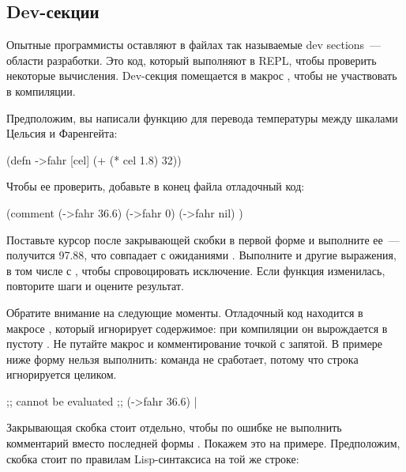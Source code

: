 \subsection{Dev-секции}

Опытные программисты оставляют в файлах так называемые dev sections~--- области разработки. Это код, который выполняют в REPL, чтобы проверить некоторые вычисления. Dev-секция помещается в макрос , чтобы не участвовать в компиляции.

Предположим, вы написали функцию  для перевода температуры между шкалами Цельсия и Фаренгейта:

\begin{english}
  \begin{clojure}
(defn ->fahr [cel]
  (+ (* cel 1.8) 32))
  \end{clojure}
\end{english}

Чтобы ее проверить, добавьте в конец файла отладочный код:

\begin{english}
  \begin{clojure/lines}
(comment
  (->fahr 36.6)
  (->fahr 0)
  (->fahr nil)
  )
  \end{clojure/lines}
\end{english}

Поставьте курсор после закрывающей скобки в первой форме и выполните ее~--- получится 97.88, что совпадает с ожиданиями . Выполните и другие выражения, в том числе с , чтобы спровоцировать исключение. Если функция изменилась, повторите шаги и оцените результат.

Обратите внимание на следующие моменты. Отладочный код находится в макросе , который игнорирует содержимое: при компиляции он вырождается в пустоту . Не путайте макрос  и комментирование точкой с запятой. В примере ниже форму нельзя выполнить: команда  не сработает, потому что строка игнорируется целиком.

\begin{english}
  \begin{clojure}
;; cannot be evaluated
;; (->fahr 36.6) |
  \end{clojure}
\end{english}

Закрывающая скобка  стоит отдельно, чтобы по ошибке не выполнить комментарий вместо последней формы . Покажем это на примере. Предположим, скобка стоит по правилам Lisp-синтаксиса на той же строке:

